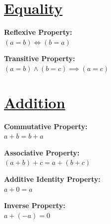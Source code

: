 \documentclass[12pt]{article}
\begin{document}
\twocolumn

\section*{\underline{\textbf{Equality}}}
\begin{minipage}{\textwidth}
    \end{minipage}
    \begin{minipage}{\textwidth}
    \textbf{Reflexive Property:}
    \\ \( (a = b) \iff (b = a) \)
\end{minipage}
\begin{minipage}{\textwidth}
    \textbf{Transitive Property:}
    \\ \( (a = b) \land (b = c) \implies (a = c) \)
\end{minipage}



\section*{\underline{\textbf{Addition}}}
\begin{minipage}{\textwidth}
    \textbf{Commutative Property:}
    \\ \( a + b = b + a \)
\end{minipage}
\begin{minipage}{\textwidth}
    \textbf{Associative Property:}
    \\ \( (a + b) + c = a + (b + c) \)
\end{minipage}
\begin{minipage}{\textwidth}
    \textbf{Additive Identity Property:}
    \\ \( a + 0 = a \)
\end{minipage}
\begin{minipage}{\textwidth}
    \textbf{Inverse Property:}
    \\ \( a + (-a) = 0 \)
\end{minipage}
\end{document}
